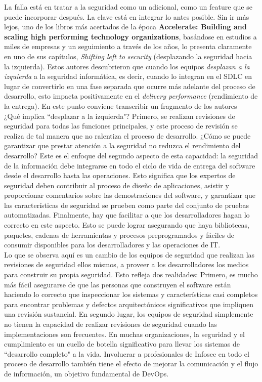 La falla está en tratar a la seguridad como un adicional, como un feature que se puede incorporar después. La clave está en integrar lo antes posible. Sin ir más lejos, uno de los libros más acertados de la época \textbf{Accelerate: Building and scaling high performing technology organizations}\cite{forsgren2018accelerate}, basándose en estudios a miles de empresas y un seguimiento a través de los años, lo presenta claramente en uno de sus capítulos, \textit{Shifting left to security} (desplazando la seguridad hacia la izquierda). Estos autores descubrieron que cuando los equipos \textit{desplazan a la izquierda} a la seguridad informática, es decir, cuando lo integran en el SDLC en lugar de convertirlo en una fase separada que ocurre más adelante del proceso de desarrollo, esto impacta positivamente en el \textit{delivery performance} (rendimiento de la entrega). En este punto conviene transcribir un fragmento de los autores\\

\textsf{¿Qué implica ``desplazar a la izquierda"? Primero, se realizan revisiones de seguridad para todas las funciones principales, y este proceso de revisión se realiza de tal manera que no ralentiza el proceso de desarrollo. ¿Cómo se puede garantizar que prestar atención a la seguridad no reduzca el rendimiento del desarrollo? Este es el enfoque del segundo aspecto de esta capacidad: la seguridad de la información debe integrarse en todo el ciclo de vida de entrega del software desde el desarrollo hasta las operaciones. Esto significa que los expertos de seguridad deben contribuir al proceso de diseño de aplicaciones, asistir y proporcionar comentarios sobre las demostraciones del software, y garantizar que las características de seguridad se prueben como parte del conjunto de pruebas automatizadas. Finalmente, hay que facilitar a que los desarrolladores hagan lo correcto en este aspecto. Esto se puede lograr asegurando que haya bibliotecas, paquetes, cadenas de herramientas y procesos preprogramados y fáciles de consumir disponibles para los desarrolladores y las operaciones de IT.}\\

\textsf{Lo que se observa aquí es un cambio de los equipos de seguridad que realizan las revisiones de seguridad ellos mismos, a proveer a los desarrolladores los medios para construir su propia seguridad. Esto refleja dos realidades: Primero, es mucho más fácil asegurarse de que las personas que construyen el software están haciendo lo correcto que inspeccionar los sistemas y características casi completos para encontrar problemas y defectos arquitectónicos significativos que impliquen una revisión sustancial. En segundo lugar, los equipos de seguridad simplemente no tienen la capacidad de realizar revisiones de seguridad cuando las implementaciones son frecuentes. En muchas organizaciones, la seguridad y el cumplimiento es un cuello de botella significativo para llevar los sistemas de ``desarrollo completo" a la vida. Involucrar a profesionales de Infosec en todo el proceso de desarrollo también tiene el efecto de mejorar la comunicación y el flujo de información, un objetivo fundamental de DevOps.}\\

